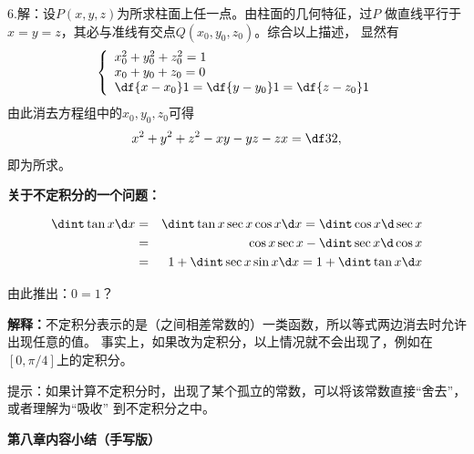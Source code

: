 6.\;解：设$P(x,y,z)$为所求柱面上任一点。由柱面的几何特征，过$P$
做直线平行于$x=y=z$，其必与准线有交点$Q(x_0,y_0,z_0)$。综合以上描述，
显然有
$$
	\left\{\begin{array}{l}
		x_0^2+y_0^2+z_0^2=1\\
		x_0+y_0+z_0=0\\
		\df{x-x_0}1=\df{y-y_0}1=\df{z-z_0}1
	\end{array}
	\right.
$$
由此消去方程组中的$x_0,y_0,z_0$可得
$$x^2+y^2+z^2-xy-yz-zx=\df32,$$
即为所求。

\ifvisible

\newpage

{\bf 关于不定积分的一个问题：}

\begin{eqnarray*}
	\dint\tan x\d x & = & \dint\tan x\sec x\cos x\d x=\dint\cos x\d\sec x\\
	& = & \cos x\sec x-\dint\sec x\d\cos x\\
	& = & 1+\dint\sec x\sin x\d x
	= 1+\dint\tan x\d x
\end{eqnarray*}

由此推出：$0=1$？

{\bf 解释：}不定积分表示的是（之间相差常数的）一类函数，所以等式两边消去时允许出现任意的值。
事实上，如果改为定积分，以上情况就不会出现了，例如在$[0,\pi/4]$上的定积分。

提示：如果计算不定积分时，出现了某个孤立的常数，可以将该常数直接“舍去”，或者理解为“吸收”
到不定积分之中。

\newpage

{\bf 第八章内容小结（手写版）}

